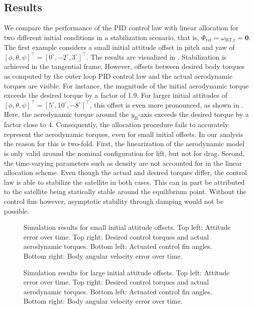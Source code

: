 \documentclass[pdflatex,sn-mathphys-num]{sn-jnl}%
\theoremstyle{thmstyleone}%
\theoremstyle{thmstyletwo}%
\theoremstyle{thmstylethree}%
\begin{document}
	\subsection{Results}
	\label{sec:results}
	We compare the performance of the PID control law with linear allocation for two different initial conditions in a stabilization scenario, that is, $\Phi_{\text{ref}}=\omega_{\text{BT,r}}=\textbf{0}$. The first example considers a small initial attitude offset in pitch and yaw of 
	$[\phi, \theta, \psi]^{\top} = [0^{\circ}, -2^{\circ}, 3^{\circ}]^{\top}$. The results are visualized in . Stabilization is achieved in the tangential frame. However, offsets between desired body torques as computed by the outer loop PID control law and the actual aerodynamic torques are visible. For instance, the magnitude of the initial aerodynamic torque exceeds the desired torque by a factor of 1.9. For larger initial attitudes of $[\phi, \theta, \psi]^{\top} = [5^{\circ}, 10^{\circ}, -8^{\circ}]^{\top}$, this offset is even more pronounced, as shown in . Here, the aerodynamic torque around the $y_{\text{B}}$-axis exceeds the desired torque by a factor close to 4. 
	Consequently, the allocation procedure fails to accurately represent the aerodynamic torques, even for small initial offsets. In our analysis the reason for this is two-fold. First, the linearization of the aerodynamic model is only valid around the nominal configuration for lift, but not for drag. Second, the time-varying parameters such as density are not accounted for in the linear allocation scheme.
	Even though the actual and desired torques differ, the control law is able to stabilize the satellite in both cases. This can in part be attributed to the satellite being statically stable around the equilibrium point. Without the control fins however, asymptotic stability through damping would not be possible.

	\begin{figure}[h]
		
		\caption{Simulation results for small initial attitude offsets. Top left: Attitude error over time. Top right: Desired control torques and actual aerodynamic torques. Bottom left: Actuated control fin angles. Bottom right: Body angular velocity error over time.}
		\label{fig:small_angle_sim_results}
	\end{figure}
	

	\begin{figure}[h]
		
		\caption{Simulation results for large initial attitude offsets. Top left: Attitude error over time. Top right: Desired control torques and actual aerodynamic torques. Bottom left: Actuated control fin angles. Bottom right: Body angular velocity error over time.}
		\label{fig:large_angle_sim_results}
	\end{figure}
	
\end{document}
